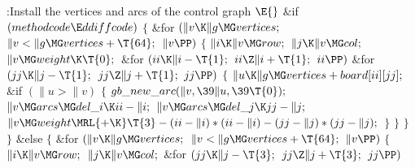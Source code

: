\B{}:Install the vertices and arcs of the control graph%
\X${}\E{}$\6
\&{if} ${}(\\{methodcode}\E\\{ddiffcode}){}$\5
${}\{{}$\1\6
\&{for} ${}(\|v\K\|g\MG\\{vertices};{}$ ${}\|v<\|g\MG\\{vertices}+\T{64};{}$
${}\|v\PP){}$\5
${}\{{}$\1\6
${}\|i\K\|v\MG\\{row};{}$\6
${}\|j\K\|v\MG\\{col};{}$\6
${}\|v\MG\\{weight}\K\T{0};{}$\6
\&{for} ${}(\\{ii}\K\|i-\T{1};{}$ ${}\\{ii}\Z\|i+\T{1};{}$ ${}\\{ii}\PP){}$\1\6
\&{for} ${}(\\{jj}\K\|j-\T{1};{}$ ${}\\{jj}\Z\|j+\T{1};{}$ ${}\\{jj}\PP){}$\5
${}\{{}$\1\6
${}\|u\K\|g\MG\\{vertices}+\\{board}[\\{ii}][\\{jj}];{}$\6
\&{if} ${}(\|u>\|v){}$\5
${}\{{}$\1\6
${}\\{gb\_new\_arc}(\|v,\39\|u,\39\T{0});{}$\6
${}\|v\MG\\{arcs}\MG\\{del\_i}\K\\{ii}-\|i;{}$\6
${}\|v\MG\\{arcs}\MG\\{del\_j}\K\\{jj}-\|j;{}$\6
${}\|v\MG\\{weight}\MRL{+{\K}}\T{3}-(\\{ii}-\|i)*(\\{ii}-\|i)-(\\{jj}-\|j)*(%
\\{jj}-\|j);{}$\6
\4${}\}{}$\2\6
\4${}\}{}$\2\2\6
\4${}\}{}$\2\6
\4${}\}{}$\2\6
\&{else}\5
${}\{{}$\1\6
\&{for} ${}(\|v\K\|g\MG\\{vertices};{}$ ${}\|v<\|g\MG\\{vertices}+\T{64};{}$
${}\|v\PP){}$\5
${}\{{}$\1\6
${}\|i\K\|v\MG\\{row};{}$\6
${}\|j\K\|v\MG\\{col};{}$\6
\&{for} ${}(\\{jj}\K\|j-\T{3};{}$ ${}\\{jj}\Z\|j+\T{3};{}$ ${}\\{jj}\PP){}$\5
